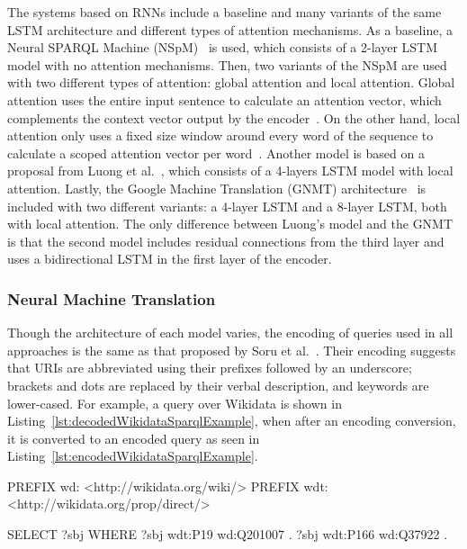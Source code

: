 The systems based on RNNs include a baseline and many variants of the same LSTM architecture 
and different types of attention mechanisms. As a baseline, a Neural SPARQL Machine 
(NSpM)~\cite{nmt:nspm-SoruMMPVEN17, nmt:CoRRSoru18} is used, which consists of a 2-layer LSTM 
model with no attention mechanisms. Then, two variants of the NSpM are used with two different 
types of attention: global attention and local attention. Global attention uses the entire 
input sentence to calculate an attention vector, which complements the context vector output by 
the encoder~\cite{nlToSparql:BahdanauCB14}. On the other hand, local attention only uses a 
fixed size window around every word of the sequence to calculate a scoped attention vector per 
word~\cite{nlToSparql:LuongPM15}. Another model is based on a proposal from 
Luong et al.~\cite{nlToSparql:LuongPM15}, which consists of a 4-layers LSTM model with local 
attention. Lastly, the Google Machine Translation (GNMT) architecture~\cite{nlToSparql:WuSCLNMKCGMKSJL16} 
is included with two different variants: a 4-layer LSTM and a 8-layer LSTM, both with local 
attention. The only difference between Luong’s model and the GNMT is that the second model 
includes residual connections from the third layer and uses a bidirectional LSTM in the first 
layer of the encoder.

\subsubsection{Neural Machine Translation}
\label{cap2:theoFrame/semPar/nlToSparql/nmt}
Though the architecture of each model varies, the encoding of \SPARQL{} queries used in all 
approaches is the same as that proposed by Soru et al.~\cite{nmt:nspm-SoruMMPVEN17}. Their 
encoding suggests that URIs are abbreviated using their prefixes  followed by an underscore; 
brackets and dots are replaced by their verbal description, and \SPARQL{} keywords are lower-cased. 
For example, a query over Wikidata is shown in Listing~\ref{lst:decodedWikidataSparqlExample}, 
when after an encoding conversion, it is converted to an encoded query as seen in 
Listing~\ref{lst:encodedWikidataSparqlExample}.

\begin{sparqlcode}[%
    caption={\SPARQL{} query before encoding.}, 
    label={lst:decodedWikidataSparqlExample}]
PREFIX wd: <http://wikidata.org/wiki/>
PREFIX wdt: <http://wikidata.org/prop/direct/>

SELECT ?sbj 
WHERE {
    ?sbj wdt:P19 wd:Q201007 .
    ?sbj wdt:P166 wd:Q37922 .
}
\end{sparqlcode}


